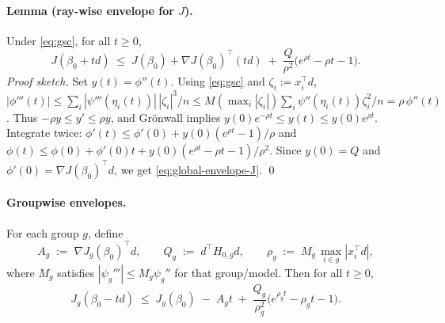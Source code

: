\documentclass[11pt]{article}
\theoremstyle{plain}
\theoremstyle{definition}
\newcommand{\1}{\mathbf{1}}
\begin{document}
\paragraph{Lemma (ray-wise envelope for $J$).}
Under \eqref{eq:gsc}, for all $t\ge 0$,
\begin{equation}
\label{eq:global-envelope-J}
J(\beta_0+t d)\;\le\; J(\beta_0)+\nabla J(\beta_0)^\top (t d)
\;+\;\frac{Q}{\rho^2}\Big(e^{\rho t}-\rho t - 1\Big).
\end{equation}
\emph{Proof sketch.}
Set $y(t)=\phi''(t)$. Using \eqref{eq:gsc} and $\zeta_i:=x_i^\top d$,
$|\phi'''(t)| \le \sum_i |\psi'''(\eta_i(t))|\,|\zeta_i|^3/n
\le M(\max_i|\zeta_i|)\sum_i \psi''(\eta_i(t))\zeta_i^2/n
= \rho\,\phi''(t)$.
Thus $-\rho y\le y'\le \rho y$, and Grönwall implies
$y(0)e^{-\rho t}\le y(t)\le y(0)e^{\rho t}$.
Integrate twice:
$\phi'(t)\le \phi'(0)+y(0)(e^{\rho t}-1)/\rho$ and
$\phi(t)\le \phi(0)+\phi'(0)t + y(0)(e^{\rho t}-\rho t-1)/\rho^2$.
Since $y(0)=Q$ and $\phi'(0)=\nabla J(\beta_0)^\top d$, we get \eqref{eq:global-envelope-J}. \qed

\paragraph{Groupwise envelopes.}
For each group $g$, define
\[
A_g\;:=\;\nabla J_g(\beta_0)^\top d,\qquad
Q_g\;:=\;d^\top H_{0,g} d,\qquad
\rho_g\;:=\;M_g\,\max_{i\in g}|x_i^\top d|,
\]
where $M_g$ satisfies $|\psi_g'''|\le M_g \psi_g''$ for that group/model.
Then for all $t\ge 0$,
\begin{equation}
\label{eq:group-envelope}
J_g(\beta_0-t d)\;\le\; J_g(\beta_0)\;-\;A_g t\;+\;\frac{Q_g}{\rho_g^2}\Big(e^{\rho_g t}-\rho_g t - 1\Big).
\end{equation}
\end{document}
